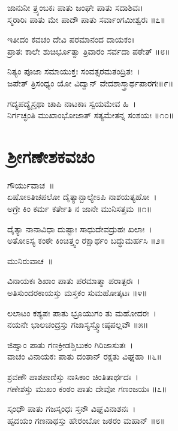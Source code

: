 ಜಾನುನೀ ತ್ರ್ಯಂಬಕಃ ಪಾತು ಜಂಘೇ ಪಾತು ಸದಾಶಿವಃ।\\
ಸ್ಮರಾರಿಃ ಪಾತು ಮೇ ಪಾದೌ ಪಾತು ಸರ್ವಾಂಗಮೀಶ್ವರಃ ॥೭॥

ಇತೀದಂ ಕವಚಂ ದೇವಿ ಪರಮಾನಂದ ದಾಯಕಂ।\\
ಪ್ರಾತಃ ಕಾಲೇ ಶುಚಿರ್ಭೂತ್ವಾ ತ್ರಿವಾರಂ ಸರ್ವದಾ ಪಠೇತ್ ॥೮॥

ನಿತ್ಯಂ ಪೂಜಾ ಸಮಾಯುಕ್ತಃ ಸಂವತ್ಸರಮತಂದ್ರಿತಃ~।\\
ಜಪೇತ್ ತ್ರಿಸಂಧ್ಯಂ ಯೋ ವಿದ್ವಾನ್ ವೇದಶಾಸ್ತ್ರಾರ್ಥಪಾರಗಃ॥೯॥

ಗದ್ಯಪದ್ಯೈಸ್ತಥಾ ಚಾಪಿ ನಾಟಕಾಃ ಸ್ವಯಮೇವ ಹಿ~।\\
ನಿರ್ಗಚ್ಛಂತಿ ಮುಖಾಂಭೋಜಾತ್ ಸತ್ಯಮೇತನ್ನ ಸಂಶಯಃ ॥೧೦॥
\section{ಶ್ರೀಗಣೇಶಕವಚಂ }
ಗೌರ್ಯುವಾಚ~॥\\
ಏಷೋಽತಿಚಪಲೋ ದೈತ್ಯಾನ್ಬಾಲ್ಯೇಽಪಿ ನಾಶಯತ್ಯಹೋ~।\\
ಅಗ್ರೇ ಕಿಂ ಕರ್ಮ ಕರ್ತೇತಿ ನ ಜಾನೇ ಮುನಿಸತ್ತಮ ॥೧॥

ದೈತ್ಯಾ ನಾನಾವಿಧಾ ದುಷ್ಟಾಃ ಸಾಧುದೇವದ್ರುಹಃ ಖಲಾಃ~।\\
ಅತೋಽಸ್ಯ ಕಂಠೇ ಕಿಂಚಿತ್ತ್ವಂ ರಕ್ಷಾರ್ಥಂ ಬದ್ಧುಮರ್ಹಸಿ ॥೨॥

ಮುನಿರುವಾಚ~॥\\

ವಿನಾಯಕಃ ಶಿಖಾಂ ಪಾತು ಪರಮಾತ್ಮಾ ಪರಾತ್ಪರಃ~।\\
ಅತಿಸುಂದರಕಾಯಸ್ತು ಮಸ್ತಕಂ ಸುಮಹೋತ್ಕಟಃ ॥೪॥

ಲಲಾಟಂ ಕಶ್ಯಪಃ ಪಾತು ಭ್ರೂಯುಗಂ ತು ಮಹೋದರಃ~।\\
ನಯನೇ ಭಾಲಚಂದ್ರಸ್ತು ಗಜಾಸ್ಯಸ್ತ್ವೋಷ್ಠಪಲ್ಲವೌ ॥೫॥

ಜಿಹ್ವಾಂ ಪಾತು ಗಣಕ್ರೀಡಶ್ಚಿಬುಕಂ ಗಿರಿಜಾಸುತಃ~।\\
ವಾಚಂ ವಿನಾಯಕಃ ಪಾತು ದಂತಾನ್ ರಕ್ಷತು ವಿಘ್ನಹಾ ॥೬॥

ಶ್ರವಣೌ ಪಾಶಪಾಣಿಸ್ತು ನಾಸಿಕಾಂ ಚಿಂತಿತಾರ್ಥದಃ~।\\
ಗಣೇಶಸ್ತು ಮುಖಂ ಕಂಠಂ ಪಾತು ದೇವೋ ಗಣಂಜಯಃ ॥೭॥

ಸ್ಕಂಧೌ ಪಾತು ಗಜಸ್ಕಂಧಃ ಸ್ತನೌ ವಿಘ್ನವಿನಾಶನಃ~।\\
ಹೃದಯಂ ಗಣನಾಥಸ್ತು ಹೇರಂಬೋ ಜಠರಂ ಮಹಾನ್ ॥೮॥

